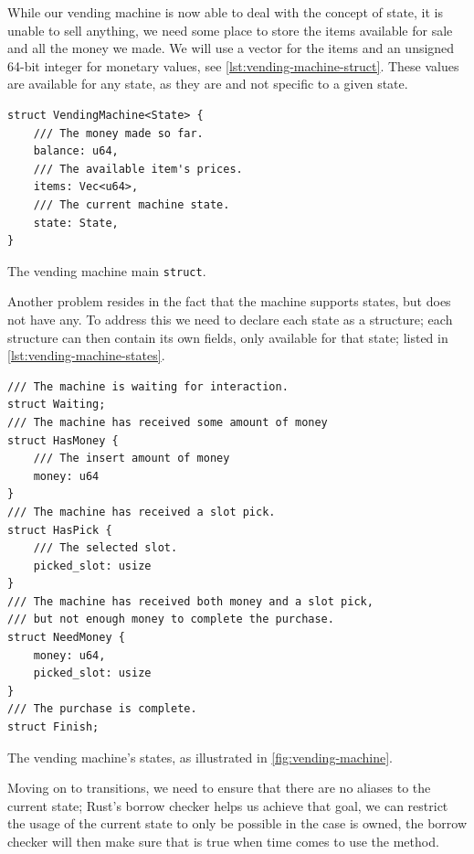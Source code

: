 While our vending machine is now able to deal with the concept of state,
it is unable to sell anything, we need some place to store the items available for sale and all the money we made.
We will use a vector for the items and an unsigned 64-bit integer for monetary values, see \autoref{lst:vending-machine-struct}.
These values are available for any state, as they are  and not specific to a given state.

\begin{listing}
    \begin{verbatim}
struct VendingMachine<State> {
    /// The money made so far.
    balance: u64,
    /// The available item's prices.
    items: Vec<u64>,
    /// The current machine state.
    state: State,
}
\end{verbatim}
    \caption{The vending machine main \texttt{struct}.}
    \label{lst:vending-machine-struct}
\end{listing}

Another problem resides in the fact that the machine supports states, but does not have any.
To address this we need to declare each state as a structure;
each structure can then contain its own fields, only available for that state;
listed in \autoref{lst:vending-machine-states}.

\begin{listing}
    \begin{verbatim}
/// The machine is waiting for interaction.
struct Waiting;
/// The machine has received some amount of money
struct HasMoney {
    /// The insert amount of money
    money: u64
}
/// The machine has received a slot pick.
struct HasPick {
    /// The selected slot.
    picked_slot: usize
}
/// The machine has received both money and a slot pick,
/// but not enough money to complete the purchase.
struct NeedMoney {
    money: u64,
    picked_slot: usize
}
/// The purchase is complete.
struct Finish;
\end{verbatim}
    \caption{The vending machine's states, as illustrated in \autoref{fig:vending-machine}.}
    \label{lst:vending-machine-states}
\end{listing}

Moving on to transitions, we need to ensure that there are no aliases to the current state;
Rust's borrow checker helps us achieve that goal,
we can restrict the usage of the current state to only be possible in the case  is owned,
the borrow checker will then make sure that is true when time comes to use the method.

